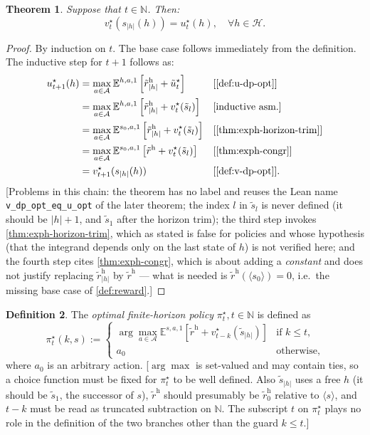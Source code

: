 \documentclass[letterpaper]{article}
\theoremstyle{plain}
\newtheorem{theorem}{Theorem}[subsection]
\theoremstyle{definition}
\newtheorem{definition}[theorem]{Definition}
\theoremstyle{remark}
\newcommand{\Nats}{\mathbb{N}}
\newcommand{\E}{\mathbb{E}}
\newcommand{\opt}{^{\star}}
\newcommand{\rew}{\tilde{r}^{\mathrm{h}}}
\newcommand{\why}[1]{\text{[#1]}}
\newcommand{\cc}[1]{\textcolor{ccolor}{[#1]}}
\newcommand{\lean}[1]{\textcolor{blue}{(\emph{LEAN}: \texttt{#1})}}
\newcommand{\leanok}{}
\begin{document}
\begin{theorem}
Suppose that $t\in \Nats $. Then:
\[
v\opt_t(s_{|h|}(h)) = u\opt_t(h), \quad \forall h\in \mathcal{H}.
\]
\end{theorem}
\begin{proof}
By induction on $t$. The base case follows immediately from the definition. The inductive step for $t+1$ follows as:
\begin{align*}
  u\opt_{t+1}(h)
  &= \max_{a\in \mathcal{A}} \E^{h, a, 1} \left[ \rew_{|h|} + \tilde{u}\opt_t  \right]
  && \why{\cref{def:u-dp-opt}} \\
  &= \max_{a\in \mathcal{A}} \E^{h, a, 1} \left[ \rew_{|h|} + v\opt_t(\tilde{s}_l) \right] 
    && \why{inductive asm.}  \\
  &= \max_{a\in \mathcal{A}} \E^{s_0, a, 1} \left[ \rew_{|h|} + v\opt_t(\tilde{s}_l) \right]
    && \why{\cref{thm:exph-horizon-trim}} \\
  &= \max_{a\in \mathcal{A}} \E^{s_0, a, 1} \left[ \rew + v\opt_t(\tilde{s}_l) \right]
  && \why{\cref{thm:exph-congr}} \\
  &= v\opt_{t+1}(s_{|h|}(h)) && \why{\cref{def:v-dp-opt}}.
\end{align*}
\cc{Problems in this chain: the theorem has no label and reuses the Lean name \texttt{v\_dp\_opt\_eq\_u\_opt} of the later theorem; the index $l$ in $\tilde{s}_l$ is never defined (it should be $|h|+1$, and $\tilde{s}_1$ after the horizon trim); the third step invokes \cref{thm:exph-horizon-trim}, which as stated is false for policies and whose hypothesis (that the integrand depends only on the last state of $h$) is not verified here; and the fourth step cites \cref{thm:exph-congr}, which is about adding a \emph{constant} and does not justify replacing $\rew_{|h|}$ by $\rew$ --- what is needed is $\rew(\langle s_0\rangle)=0$, i.e.\ the missing base case of \cref{def:reward}.}
\end{proof}


\begin{definition} \label{def:pi-opt}
  The \emph{optimal finite-horizon policy} $\pi\opt_t, t\in \Nats$ is defined as
  \[
    \pi\opt_t(k,s) :=
    \begin{cases}
      \arg\max_{a\in \mathcal{A}}  \E^{s, a, 1} \left[ \rew + v_{t-k}\opt (\tilde{s}_{|h|}) \right]
      &\text{if } k \le t, \\
      a_0 &\text{otherwise},
    \end{cases}
  \]
  where $a_0$ is an arbitrary action.
  \cc{$\arg\max$ is set-valued and may contain ties, so a choice function must be fixed for $\pi\opt_t$ to be well defined. Also $\tilde{s}_{|h|}$ uses a free $h$ (it should be $\tilde{s}_1$, the successor of $s$), $\rew$ should presumably be $\rew_0$ relative to $\langle s\rangle$, and $t-k$ must be read as truncated subtraction on $\Nats$. The subscript $t$ on $\pi\opt_t$ plays no role in the definition of the two branches other than the guard $k\le t$.}
\end{definition}
\end{document}
